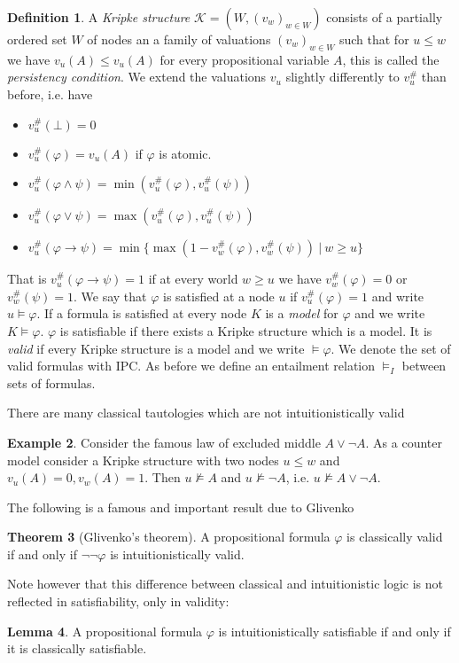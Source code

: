 \documentclass[a4paper,12pt]{report}
\theoremstyle{definition}
\newtheorem{theorem}{Theorem}[section]
\theoremstyle{definition}
\theoremstyle{definition}
\newtheorem{lemma}[theorem]{Lemma}
\theoremstyle{definition}
\theoremstyle{definition}
\newtheorem{definition}[theorem]{Definition}
\theoremstyle{definition}
\newtheorem{example}[theorem]{Example}
\theoremstyle{definition}
\begin{document}
	\begin{definition}
		A \textit{Kripke structure} $\mathcal K = (W, (v_w)_{w\in W})$ consists of a partially ordered set $W$ of nodes an a family of valuations $(v_w)_{w\in W}$ such that for $u\leq w$ we have $v_u(A)\leq v_u(A)$ for every propositional variable $A$, this is called the \textit{persistency condition}. We extend the valuations $v_u$ slightly differently to $v_u^\#$ than before, i.e. have
		\begin{itemize}
			\item $v_u^\#(\bot) = 0$
			\item $v_u^\#(\varphi) = v_u(A)$ if $\varphi$ is atomic.
			\item $v_u^\#(\varphi\wedge\psi) = \min(v_u^\#(\varphi), v_u^\#(\psi))$
			\item $v_u^\#(\varphi\vee\psi) = \max(v_u^\#(\varphi), v_u^\#(\psi))$
			\item $v_u^\#(\varphi\to \psi) = \min\{\max(1 - v_w^\#(\varphi), v_w^\#(\psi))\:|\:w\geq u\}$
		\end{itemize}
		That is $v_u^\#(\varphi\to \psi) = 1$ if at every world $w\geq u$ we have $v_w^\#(\varphi) = 0$ or $v_w^\#(\psi) = 1$. We say that $\varphi$ is satisfied at a node $u$ if $v_u^\#(\varphi) = 1$ and write $u\models\varphi$. If a formula is satisfied at every node $K$ is a \textit{model} for $\varphi$ and we write $K\models \varphi$. $\varphi$ is satisfiable if there exists a Kripke structure which is a model. It is \textit{valid} if every Kripke structure is a model and we write $\models \varphi$. We denote the set of valid formulas with IPC. As before we define an entailment relation $\models_I$ between sets of formulas.
	\end{definition}
	There are many classical tautologies which are not intuitionistically valid
	\begin{example}\label{LEMcounterexample}
		Consider the famous law of excluded middle $A\vee\neg A$. As a counter model consider a Kripke structure with two nodes $u\leq w$ and $v_u(A) = 0, v_w(A) = 1$. Then $u\not\models A$ and $u\not\models \neg A$, i.e. $u\not\models A\vee\neg A$. 
	\end{example}
	The following is a famous and important result due to Glivenko~\cite{glivenko1929}
	
	\begin{theorem}[Glivenko's theorem]
		A propositional formula $\varphi$ is classically valid if and only if $\neg\neg\varphi$ is intuitionistically valid.
	\end{theorem}
	\noindent Note however that this difference between classical and intuitionistic logic is not reflected in satisfiability, only in validity:
	\begin{lemma}\label{propsat}
		A propositional formula $\varphi$ is intuitionistically satisfiable if and only if it is classically satisfiable.
	\end{lemma}
\end{document}
